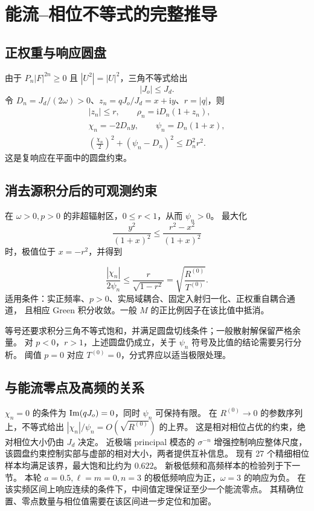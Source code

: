 \documentclass[UTF8,fontset=fandol,11pt,a4paper]{ctexart}
\newcommand{\ii}{\mathrm{i}}\newcommand{\dd}{\mathrm{d}}
\numberwithin{equation}{section}
\begin{document}
\section{能流--相位不等式的完整推导}
\subsection{正权重与响应圆盘}
由于 $P_n|F|^{2n}\geq0$ 且 $|U^2|=|U|^2$，三角不等式给出
\begin{equation}
|J_o|\leq J_d.
\end{equation}
令 $D_n=J_d/(2\omega)>0$、$z_n=qJ_o/J_d=x+\ii y$、$r=|q|$，则
\begin{gather}
|z_n|\leq r,\qquad\rho_n=\ii D_n(1+z_n),\\
\chi_n=-2D_ny,\qquad\psi_n=D_n(1+x),\\
\left(\frac{\chi_n}{2}\right)^2+(\psi_n-D_n)^2\leq D_n^2r^2.
\end{gather}
这是复响应在平面中的圆盘约束。

\subsection{消去源积分后的可观测约束}
在 $\omega>0,p>0$ 的非超辐射区，$0\leq r<1$，从而 $\psi_n>0$。
最大化
\begin{equation}
\frac{y^2}{(1+x)^2}\leq\frac{r^2-x^2}{(1+x)^2}
\end{equation}
时，极值位于 $x=-r^2$，并得到
\begin{resultbox}
\begin{equation}
\boxed{\frac{|\chi_n|}{2\psi_n}\leq\frac{r}{\sqrt{1-r^2}}
=\sqrt{\frac{R^{(0)}}{T^{(0)}}}.}
\end{equation}
适用条件：实正频率、$p>0$、实局域耦合、固定入射归一化、正权重自耦合通道，
且相应 Green 积分收敛。一般 $M$ 的正比例因子在该比值中抵消。
\end{resultbox}
等号还要求积分三角不等式饱和，并满足圆盘切线条件；一般散射解保留严格余量。
对 $p<0$，$r>1$，上述圆盘仍成立，关于 $\psi_n$ 符号及比值的结论需要另行分析。
阈值 $p=0$ 对应 $T^{(0)}=0$，分式界应以适当极限处理。

\subsection{与能流零点及高频的关系}
$\chi_n=0$ 的条件为 $\operatorname{Im}(qJ_o)=0$，同时 $\psi_n$ 可保持有限。
在 $R^{(0)}\to0$ 的参数序列上，不等式给出
$|\chi_n|/\psi_n=O(\sqrt{R^{(0)}})$ 的上界。
这是相对相位占优的约束，绝对相位大小仍由 $J_d$ 决定。
近极端 principal 模态的 $\sigma^{-n}$ 增强控制响应整体尺度，
该圆盘约束控制实部与虚部的相对大小，两者提供互补信息。
现有 27 个精细相位样本均满足该界，最大饱和比约为 $0.622$。
新极低频和高频样本的检验列于下一节。
本轮 $a=0.5,\ell=m=0,n=3$ 的极低频响应为正，$\omega=3$ 的响应为负。
在该实频区间上响应连续的条件下，中间值定理保证至少一个能流零点。
其精确位置、零点数量与相位值需要在该区间进一步定位和加密。
\end{document}
